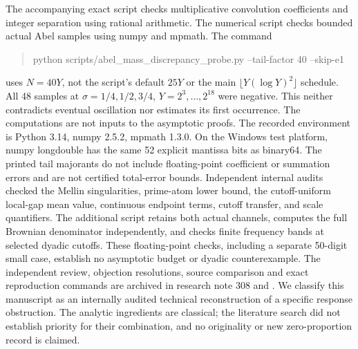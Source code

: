\documentclass[11pt,a4paper]{article}
\theoremstyle{definition}
\theoremstyle{remark}
\begin{document}
The accompanying exact script
 checks multiplicative
convolution coefficients and integer separation using rational
arithmetic. The numerical script
 checks bounded actual
Abel samples using numpy and mpmath. The command
\begin{quote}\ttfamily\small
python scripts/abel\_mass\_discrepancy\_probe.py --tail-factor 40 --skip-e1
\end{quote}
uses \(N=40Y\), not the script's default \(25Y\) or the main
\(\lfloor Y(\log Y)^2\rfloor\) schedule. All 48 samples at
\(\sigma=1/4,1/2,3/4\), \(Y=2^3,\ldots,2^{18}\) were negative.
This neither contradicts eventual oscillation nor estimates its first
occurrence. The computations are not inputs to the asymptotic proofs.
The recorded environment is Python 3.14, numpy 2.5.2, mpmath 1.3.0.
On the Windows test platform, numpy longdouble has the same
52 explicit mantissa bits as binary64. The printed tail majorants
do not include floating-point coefficient or summation errors and
are not certified total-error bounds.
Independent internal audits checked the Mellin singularities,
prime-atom lower bound, the cutoff-uniform local-gap mean value,
continuous endpoint terms, cutoff transfer, and scale quantifiers.
The additional script
 retains both actual
channels, computes the full Brownian denominator independently, and
checks finite frequency bands at selected dyadic cutoffs.
These floating-point checks, including a separate 50-digit small
case, establish no asymptotic budget or dyadic counterexample.
The independent review, objection resolutions, source comparison and
exact reproduction commands are archived in research note 308 and
. We classify this manuscript as an internally
audited technical reconstruction of a specific response obstruction.
The analytic ingredients are classical; the literature search did not
establish priority for their combination, and no originality or
new zero-proportion record is claimed.
\end{document}
